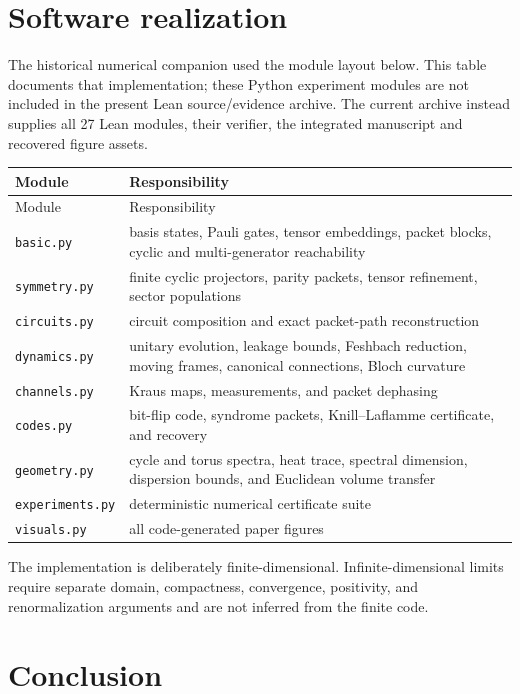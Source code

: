 \documentclass[11pt]{article}
\theoremstyle{definition}
\theoremstyle{remark}
\begin{document}
\section{Software realization}

The historical numerical companion used the module layout below. This table documents that implementation; these Python experiment modules are not included in the present Lean source/evidence archive. The current archive instead supplies all 27 Lean modules, their verifier, the integrated manuscript and recovered figure assets.

\begin{longtable}{L{0.28\textwidth}L{0.64\textwidth}}
\toprule
Module & Responsibility\\
\midrule
\endfirsthead
\toprule
Module & Responsibility\\
\midrule
\endhead
\texttt{basic.py} & basis states, Pauli gates, tensor embeddings, packet blocks, cyclic and multi-generator reachability\\
\texttt{symmetry.py} & finite cyclic projectors, parity packets, tensor refinement, sector populations\\
\texttt{circuits.py} & circuit composition and exact packet-path reconstruction\\
\texttt{dynamics.py} & unitary evolution, leakage bounds, Feshbach reduction, moving frames, canonical connections, Bloch curvature\\
\texttt{channels.py} & Kraus maps, measurements, and packet dephasing\\
\texttt{codes.py} & bit-flip code, syndrome packets, Knill--Laflamme certificate, and recovery\\
\texttt{geometry.py} & cycle and torus spectra, heat trace, spectral dimension, dispersion bounds, and Euclidean volume transfer\\
\texttt{experiments.py} & deterministic numerical certificate suite\\
\texttt{visuals.py} & all code-generated paper figures\\
\bottomrule
\end{longtable}

The implementation is deliberately finite-dimensional. Infinite-dimensional limits require separate domain, compactness, convergence, positivity, and renormalization arguments and are not inferred from the finite code.

\section{Conclusion}
\end{document}

